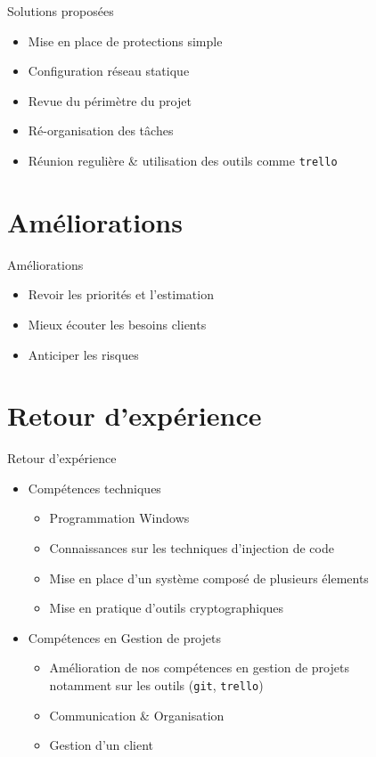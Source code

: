 \documentclass{cubeamer}
\begin{document}
\begin{frame}{Solutions proposées}
    \begin{itemize}
        \item Mise en place de protections simple
        \item Configuration réseau statique
        \item Revue du périmètre du projet
        \item Ré-organisation des tâches
        \item Réunion regulière \& utilisation des outils comme \verb:trello:
    \end{itemize}
\end{frame}

\section{Améliorations}

\begin{frame}{Améliorations}
    \begin{itemize}
        \item Revoir les priorités et l'estimation
        \item Mieux écouter les besoins clients
        \item Anticiper les risques
    \end{itemize}
\end{frame}

\section{Retour d'expérience}

\begin{frame}{Retour d'expérience}
    \begin{itemize}
        \item Compétences techniques 
            \begin{itemize}
                \item Programmation Windows 
                \item Connaissances sur les techniques d'injection de code
                \item Mise en place d'un système composé de plusieurs élements
                \item Mise en pratique d'outils cryptographiques
            \end{itemize}
        \item Compétences en Gestion de projets
             \begin{itemize}
                \item Amélioration de nos compétences en gestion de projets \\
                  notamment sur les outils (\verb:git:, \verb:trello:)
                \item Communication \& Organisation
                \item Gestion d'un client
            \end{itemize}           
    \end{itemize}
\end{frame}
\end{document}
